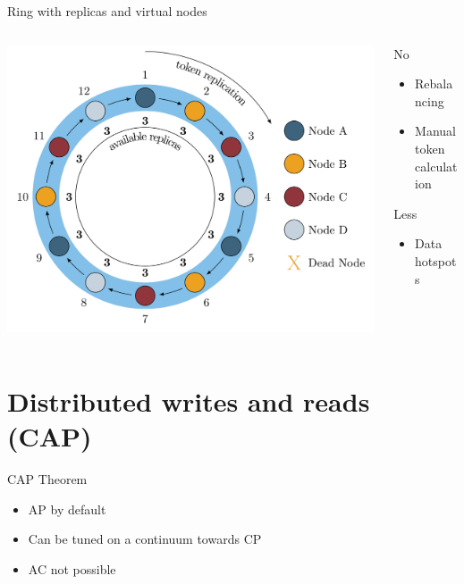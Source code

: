 \documentclass[
  10pt
]{beamer}
\begin{document}
\begin{frame}{Ring with replicas and virtual nodes \cite{yelp_balancing}}
  \begin{columns}
    \begin{column}{0.7\textwidth}
      \includegraphics[width=1.0\textwidth]{resources/replica_ring.png}
    \end{column}
    \begin{column}{0.3\textwidth}
      No
      \begin{itemize}
        \item Rebalancing
        \item Manual token calculation
      \end{itemize}
      Less
      \begin{itemize}
        \item Data hotspots
      \end{itemize}
    \end{column}
  \end{columns}
\end{frame}

\section{Distributed writes and reads (CAP)}  %

\begin{frame}{CAP Theorem \cite{cassandraInCAPtheorem}}
  \begin{itemize}
    \item AP by default
    \item Can be tuned on a continuum towards CP
    \item AC not possible  %
  \end{itemize}
\end{frame}
\end{document}
